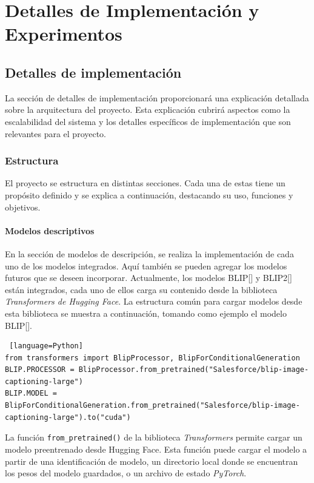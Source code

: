 \chapter{Detalles de Implementación y Experimentos}\label{chapter:implementation}


\section{Detalles de implementaci\'on}
La sección de detalles de implementación proporcionar\'a una explicación detallada sobre la arquitectura del proyecto. Esta explicación cubrir\'a aspectos como la escalabilidad del sistema y los detalles específicos de implementación que son relevantes para el proyecto.

\subsection{Estructura}
El proyecto se estructura en distintas secciones. Cada una de estas tiene un propósito definido y se explica a continuación, destacando su uso, funciones y objetivos.

\subsubsection{Modelos descriptivos}
 En la sección de modelos de descripción, se realiza la implementación de cada uno de los modelos integrados. Aquí también se pueden agregar los modelos futuros que se deseen incorporar. Actualmente, los modelos BLIP[\cite{huggingface2022blip}] y BLIP2[\cite{huggingface-blip2}] est\'an integrados, cada uno de ellos carga su contenido desde la biblioteca \textit{Transformers de Hugging Face}. La estructura común para cargar modelos desde esta biblioteca se muestra a continuación, tomando como ejemplo el modelo BLIP[\cite{huggingface2022blip}].

\begin{lstlisting} [language=Python]
from transformers import BlipProcessor, BlipForConditionalGeneration
BLIP.PROCESSOR = BlipProcessor.from_pretrained("Salesforce/blip-image-captioning-large")
BLIP.MODEL = BlipForConditionalGeneration.from_pretrained("Salesforce/blip-image-captioning-large").to("cuda")
\end{lstlisting}

La función \verb|from_pretrained()| de la biblioteca \textit{Transformers} permite cargar un modelo preentrenado desde Hugging Face. Esta función puede cargar el modelo a partir de una identificación de modelo, un directorio local donde se encuentran los pesos del modelo guardados, o un archivo de estado \textit{PyTorch}. 

